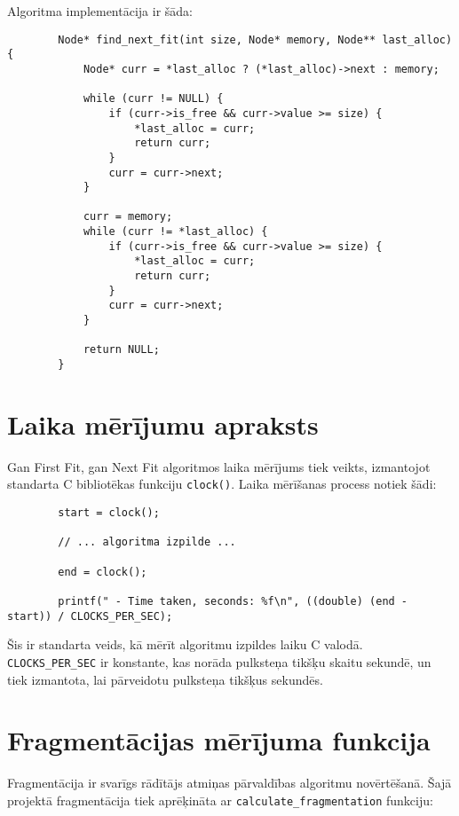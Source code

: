 \documentclass{report}
\begin{document}
	Algoritma implementācija ir šāda:
	
	\begin{verbatim}
		Node* find_next_fit(int size, Node* memory, Node** last_alloc) {
			Node* curr = *last_alloc ? (*last_alloc)->next : memory;
			
			while (curr != NULL) {
				if (curr->is_free && curr->value >= size) {
					*last_alloc = curr;
					return curr;
				}
				curr = curr->next;
			}
			
			curr = memory;
			while (curr != *last_alloc) {
				if (curr->is_free && curr->value >= size) {
					*last_alloc = curr;
					return curr;
				}
				curr = curr->next;
			}
			
			return NULL; 
		}
	\end{verbatim}
	
	\section{Laika mērījumu apraksts}
	
	Gan First Fit, gan Next Fit algoritmos laika mērījums tiek veikts, izmantojot standarta C bibliotēkas funkciju \texttt{clock()}. Laika mērīšanas process notiek šādi:
	
	\begin{verbatim}
		start = clock();
		
		// ... algoritma izpilde ...
		
		end = clock();
		
		printf(" - Time taken, seconds: %f\n", ((double) (end - start)) / CLOCKS_PER_SEC);
	\end{verbatim}
	
	Šis ir standarta veids, kā mērīt algoritmu izpildes laiku C valodā. \texttt{CLOCKS\_PER\_SEC} ir konstante, kas norāda pulksteņa tikšķu skaitu sekundē, un tiek izmantota, lai pārveidotu pulksteņa tikšķus sekundēs.
	
	\section{Fragmentācijas mērījuma funkcija}
	
	Fragmentācija ir svarīgs rādītājs atmiņas pārvaldības algoritmu novērtēšanā. Šajā projektā fragmentācija tiek aprēķināta ar \texttt{calculate\_fragmentation} funkciju:
	
\end{document}
